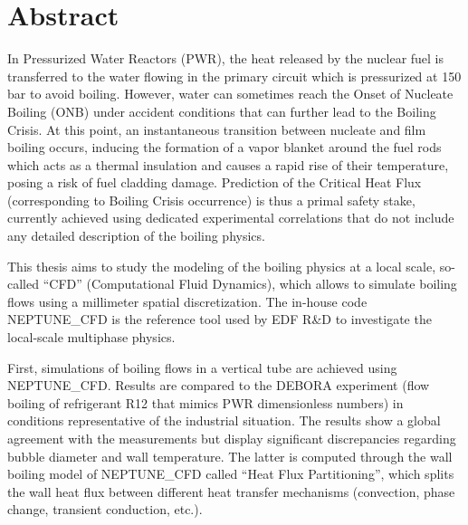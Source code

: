 


\begingroup
\let\clearpage\relax
\let\cleardoublepage\relax
\let\cleardoublepage\relax

\chapter*{Abstract}

In Pressurized Water Reactors (PWR), the heat released by the nuclear fuel is transferred to the water flowing in the primary circuit which is pressurized at 150 bar to avoid boiling. However, water can sometimes reach the Onset of Nucleate Boiling (ONB) under accident conditions that can further lead to the Boiling Crisis. At this point, an instantaneous transition between nucleate and film boiling occurs, inducing the formation of a vapor blanket around the fuel rods which acts as a thermal insulation and  causes a rapid rise of their temperature, posing a risk of fuel cladding damage. Prediction of the Critical Heat Flux (corresponding to Boiling Crisis occurrence) is thus a primal safety stake, currently achieved using dedicated experimental correlations that do not include any detailed description of the boiling physics.

\npar

This thesis aims to study the modeling of the boiling physics at a local scale, so-called  “CFD” (Computational Fluid Dynamics), which allows to simulate boiling flows using a millimeter spatial discretization. The in-house code NEPTUNE\_CFD is the reference tool used by EDF R&D to investigate the local-scale multiphase physics.

\npar

First, simulations of boiling flows in a vertical tube are achieved using NEPTUNE\_CFD. Results are compared to the DEBORA experiment (flow boiling of refrigerant R12 that mimics PWR dimensionless numbers) in conditions representative of the industrial situation. The results show a global agreement with the measurements but display significant discrepancies regarding bubble diameter and wall temperature. The latter is computed through the wall boiling model of NEPTUNE\_CFD called “Heat Flux Partitioning”, which splits the wall heat flux between different heat transfer mechanisms (convection, phase change, transient conduction, etc.).

